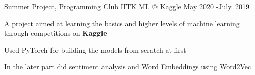 \begin{cventries}
    
  \cventry
    {Summer Project, Programming Club IITK} %
    {ML @ Kaggle} %
    {\hspace{-5em} } %
    {May 2020 -July. 2019} %
    {
      \begin{cvitems} %
        \item A project aimed at learning the basics and higher levels of machine learning through competitions on \textbf{Kaggle}
        \item Used PyTorch for building the models from scratch at first
        \item In the later part did sentiment analysis and Word Embeddings using Word2Vec 
      \end{cvitems}
    }


\end{cventries}

